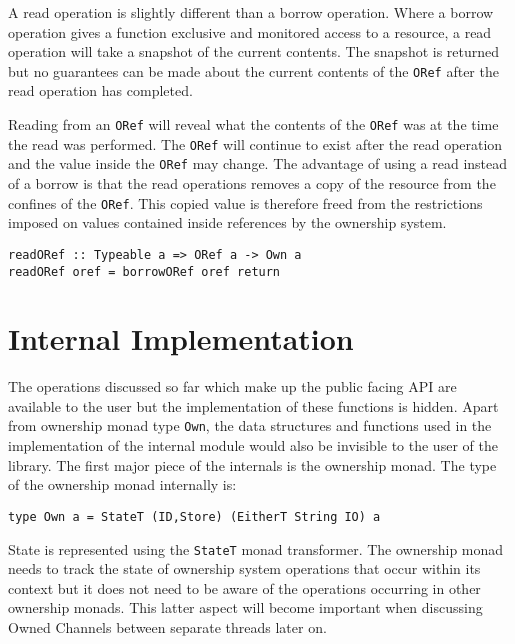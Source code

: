 \documentclass[onehalf,11pt]{beavtex}
\begin{document}
A read operation is slightly different than a borrow operation. Where a borrow
operation gives a function exclusive and monitored access to a resource, a read
operation will take a snapshot of the current contents. The snapshot is returned
but no guarantees can be made about the current contents of the \texttt{ORef}
after the read operation has completed.

Reading from an \texttt{ORef} will reveal what the contents of the \texttt{ORef}
was at the time the read was performed.  The \texttt{ORef} will continue to
exist after the read operation and the value inside the \texttt{ORef} may change.
The advantage of using a read instead of a borrow is that the read operations
removes a copy of the resource from the confines of the \texttt{ORef}.
This copied value is therefore freed from the restrictions imposed on values
contained inside references by the ownership system.

\begin{verbatim}
readORef :: Typeable a => ORef a -> Own a
readORef oref = borrowORef oref return
\end{verbatim}


\section{Internal Implementation}

The operations discussed so far which make up the public facing API are
available to the user but the implementation of these functions is hidden.
Apart from ownership monad type \texttt{Own},
the data structures and functions used in the implementation of the internal
module would also be invisible to the user of the library. The first major
piece of the internals is the ownership monad. The type of the ownership monad
internally is:

\begin{verbatim}
type Own a = StateT (ID,Store) (EitherT String IO) a
\end{verbatim}


State is represented using the \texttt{StateT} monad transformer.
The ownership monad needs to track the state of ownership system operations
that occur within its context but it does not need to be aware of the
operations occurring in other ownership monads.
This latter aspect will become important when discussing Owned Channels between
separate threads later on.
\end{document}
